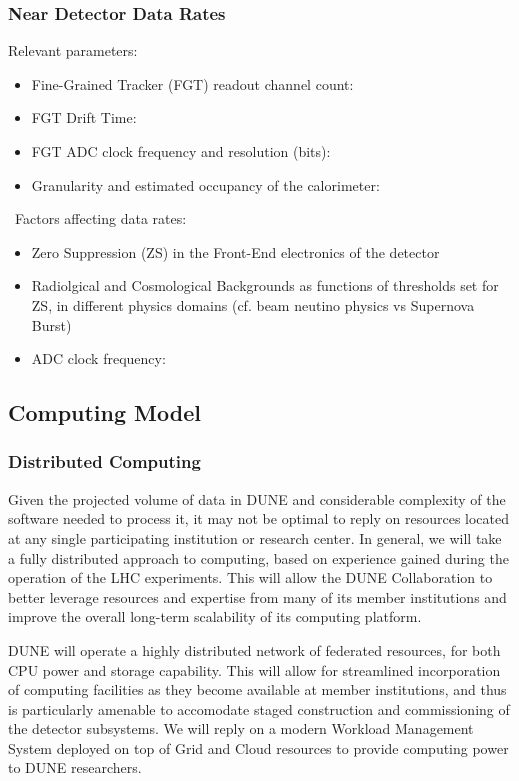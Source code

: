 \subsubsection{Near Detector Data Rates}
Relevant parameters:
\begin{itemize}
\item Fine-Grained Tracker (FGT) readout channel count:
\item FGT Drift Time:
\item FGT ADC clock frequency and resolution (bits):
\item Granularity and estimated occupancy of the calorimeter:
\end{itemize}
\
Factors affecting data rates:
\begin{itemize}
\item Zero Suppression (ZS)  in the Front-End electronics of the detector
\item Radiolgical and Cosmological Backgrounds as functions of thresholds set for ZS, in different physics domains (cf. beam neutino physics vs Supernova Burst)
\item ADC clock frequency:
\end{itemize}

\subsection{Computing Model}
\label{sec:detectors-sc-infrastructure-computing-model}

\subsubsection{Distributed Computing}

Given the projected volume of  data in DUNE and considerable complexity of the software needed to process it, it may not be optimal to reply on resources located at any single
participating institution or research center. In general, we will take a fully distributed approach to computing, based on experience gained during the operation of the LHC experiments.
This will allow the DUNE Collaboration to better leverage resources and expertise from many of its member institutions and improve the overall long-term scalability of its computing
platform.

DUNE will operate a highly distributed network of federated resources, for both CPU power and storage capability. This will allow for streamlined incorporation of computing facilities
as they become available at member institutions, and thus is particularly amenable to accomodate staged construction and commissioning of the detector subsystems. We will reply
on a modern Workload Management System deployed on top of Grid and Cloud resources to provide computing power to DUNE researchers.

